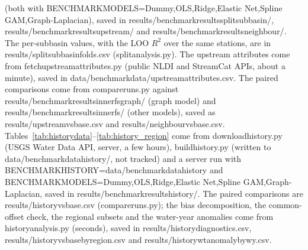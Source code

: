 \documentclass[11pt]{article}
\newcommand{\codeus}{\textunderscore\allowbreak}
\newcommand{\code}[1]{{\ttfamily\let\_\codeus #1}}
\begin{document}
(both with \code{BENCHMARK\_MODELS=Dummy,OLS,Ridge,Elastic Net,Spline GAM,Graph-Laplacian}), saved
in \code{results/benchmark\_results\_split\_subbasin/}, \code{results/benchmark\_results\_upstream/}
and \code{results/benchmark\_results\_neighbour/}. The per-subbasin values, with the LOO $R^2$ over
the same stations, are in \code{results/split\_subbasin\_folds.csv} (\code{split\_analysis.py}). The
upstream attributes come from \code{fetch\_upstream\_attributes.py} (public NLDI and StreamCat
APIs, about a minute), saved in \code{data/benchmark\_data/upstream\_attributes.csv}. The paired
comparisons come from \code{compare\_runs.py} against \code{results/benchmark\_results\_inner\_fs\_graph/}
(graph model) and \code{results/benchmark\_results\_inner\_fs/} (other models), saved as
\code{results/upstream\_vs\_base\_*.csv} and \code{results/neighbour\_vs\_base\_*.csv}.
Tables~\ref{tab:historydata}--\ref{tab:history_region} come from \code{download\_history.py}
(USGS Water Data API, server, a few hours), \code{build\_history.py} (written to
\code{data/benchmark\_data\_history/}, not tracked) and a server run with
\code{BENCHMARK\_HISTORY=data/benchmark\_data\_history} and
\code{BENCHMARK\_MODELS=Dummy,OLS,Ridge,Elastic Net,Spline GAM,Graph-Laplacian}, saved in
\code{results/benchmark\_results\_history/}. The paired comparisons are
\code{results/history\_vs\_base\_*.csv} (\code{compare\_runs.py}); the bias decomposition, the
common-offset check, the regional subsets and the water-year anomalies come from
\code{history\_analysis.py} (seconds), saved in \code{results/history\_diagnostics.csv},
\code{results/history\_vs\_base\_by\_region.csv} and \code{results/history\_wt\_anomaly\_by\_wy.csv}.
\end{document}
